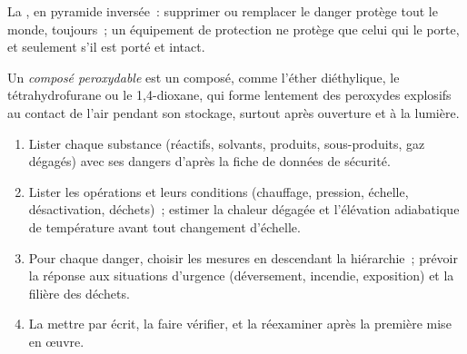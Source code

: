 \begin{omfigure}

{\small La , en pyramide inversée~:
supprimer ou remplacer le danger protège tout le monde, toujours~; un
équipement de protection ne protège que celui qui le porte, et seulement
s'il est porté et intact.}
\end{omfigure}

\begin{definition}\label{def:b3:lab-techniques-3:peroxide}
Un \emph{composé peroxydable} est un composé, comme
l'éther diéthylique, le tétrahydrofurane ou le 1,4-dioxane, qui forme
lentement des peroxydes explosifs au contact de l'air pendant son
stockage, surtout après ouverture et à la lumière.
\end{definition}

\begin{method}\label{met:b3:lab-techniques-3:risk-assessment}
\begin{enumerate}
  \item Lister chaque substance (réactifs, solvants, produits,
        sous-produits, gaz dégagés) avec ses dangers d'après la fiche de
        données de sécurité.
  \item Lister les opérations et leurs conditions (chauffage, pression,
        échelle, désactivation, déchets)~; estimer la chaleur dégagée et
        l'élévation adiabatique de température avant tout changement
        d'échelle.
  \item Pour chaque danger, choisir les mesures en descendant la
        hiérarchie~; prévoir la réponse aux situations d'urgence
        (déversement, incendie, exposition) et la filière des déchets.
  \item La mettre par écrit, la faire vérifier, et la réexaminer après la
        première mise en œuvre.
\end{enumerate}
\end{method}

